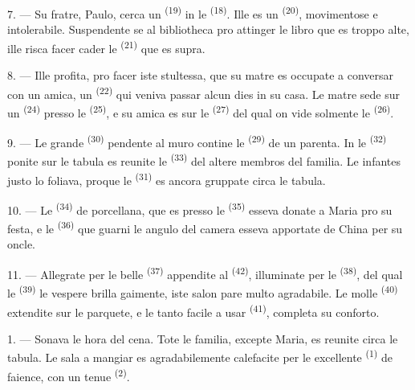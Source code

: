 \VUsaut{5.0mm}
\VUsaut{3.0mm}

7. --- Su fratre, Paulo, cerca un  \textsuperscript{(19)} in le
 \textsuperscript{(18)}. Ille es un 
\textsuperscript{(20)}, movimentose e intolerabile. Suspendente se al bibliotheca
pro attinger le libro que es troppo alte, ille risca facer cader le
 \textsuperscript{(21)} que es supra.

8. --- Ille profita, pro facer iste stultessa, que su matre es occupate a
conversar con un amica, un  \textsuperscript{(22)} qui veniva
passar alcun dies in su casa. Le matre sede sur un 
\textsuperscript{(24)} presso le  \textsuperscript{(25)}, e su
amica es sur le  \textsuperscript{(27)} del qual on vide solmente
le  \textsuperscript{(26)}.

9. --- Le grande  \textsuperscript{(30)} pendente al muro contine
le  \textsuperscript{(29)} de un parenta. In le
 \textsuperscript{(32)} ponite sur le tabula es reunite le
 \textsuperscript{(33)} del altere membros del familia. Le
infantes justo lo foliava, proque le  \textsuperscript{(31)} es
ancora gruppate circa le tabula.

10. --- Le  \textsuperscript{(34)} de porcellana, que es
presso le  \textsuperscript{(35)} esseva donate a Maria
pro su festa, e le  \textsuperscript{(36)} que guarni le angulo
del camera esseva apportate de China per su oncle.

11. --- Allegrate per le belle  \textsuperscript{(37)}
appendite al  \textsuperscript{(42)}, illuminate per le
 \textsuperscript{(38)}, del qual le  \textsuperscript{(39)} le vespere brilla gaimente, iste salon pare
multo agradabile. Le molle  \textsuperscript{(40)} extendite sur
le parquete, e le tanto facile a usar 
\textsuperscript{(41)}, completa su conforto.

\VUsaut{3.6mm}
\VUsaut{3.0mm}

1. --- Sonava le hora del cena. Tote le familia, excepte Maria, es reunite circa
le tabula. Le sala a mangiar es agradabilemente calefacite per le excellente
 \textsuperscript{(1)} de faience, con un tenue 
\textsuperscript{(2)}.

